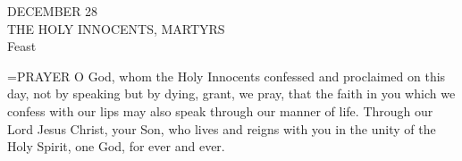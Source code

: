 \begin{center}\normalsize DECEMBER 28\\
\footnotesize THE HOLY INNOCENTS, MARTYRS\\
\footnotesize Feast\\
\end{center}

\hangindent=\parindent \small{PRAYER 
O God, whom the Holy Innocents confessed
and proclaimed on this day,
not by speaking but by dying,
grant, we pray,
that the faith in you which we confess with our lips
may also speak through our manner of life.
Through our Lord Jesus Christ, your Son,
who lives and reigns with you in the unity of the Holy Spirit,
one God, for ever and ever.\\}
 
